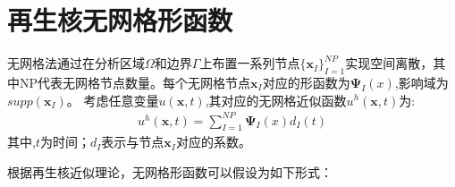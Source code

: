 \documentclass[11pt,a4paper]{article}
\begin{document}
\section{再生核无网格形函数}
无网格法通过在分析区域$\Omega$和边界$\Gamma$上布置一系列节点$\{\pmb x_I\}^{N\!P}_{I=1}$实现空间离散，其中NP代表无网格节点数量。每个无网格节点$\pmb x_I$对应的形函数为$\pmb \Psi_I(x)$,影响域为$supp(\pmb x_I)$。
考虑任意变量$u(\pmb x,t)$,其对应的无网格近似函数$u^h(\pmb x,t)$为:
\begin{displaymath}
    \begin{equation}
        \begin{split}
        u^h(\pmb x,t)=\sum_{I=1}^{NP}\pmb \Psi_I(x)d_I(t)    
        \end{split}
    \end{equation}      
\end{displaymath}
其中,$t$为时间；$d_I$表示与节点$\pmb x_I$对应的系数。\par
根据再生核近似理论，无网格形函数可以假设为如下形式：
\end{document}
